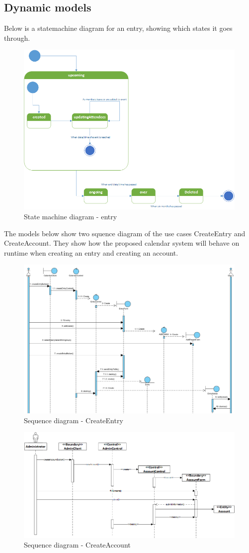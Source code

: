 \subsection{Dynamic models}
Below is a statemachine diagram for an entry, showing which states it goes through.
\begin{figure}[h]
\centering
\includegraphics[scale = 0.5]{statemachine}
\caption{State machine diagram - entry}
\end{figure}
\pagebreak
\linebreak
The models below show two squence diagram of the use cases CreateEntry and CreateAccount. They show how the proposed calendar system will behave on runtime when creating an entry and creating an account.
\begin{figure}[ht]
\centering
\includegraphics[scale = 0.6]{sequenceDiagram2}
\caption{Sequence diagram - CreateEntry}
\end{figure}
\pagebreak
\begin{figure}[h]
\centering
\includegraphics[scale = 0.6]{sequenceDiagram1}
\caption{Sequence diagram - CreateAccount}
\end{figure}